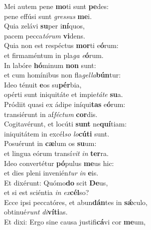 \evenverse Mei autem pene \textbf{mo}ti sunt \textbf{pe}des:~\*\\
\evenverse pene effúsi sunt \textit{gres}\textit{sus} \textbf{me}i.\\
\oddverse Quia zelávi \textbf{su}per i\textbf{ní}quos,~\*\\
\oddverse pacem pecca\textit{tó}\textit{rum} \textbf{vi}dens.\\
\evenverse Quia non est respéctus \textbf{mor}ti e\textbf{ó}rum:~\*\\
\evenverse et firmaméntum in pla\textit{ga} \textit{e}\textbf{ó}rum.\\
\oddverse In labóre \textbf{hó}minum \textbf{non} sunt:~\*\\
\oddverse et cum homínibus non fla\textit{gel}\textit{la}\textbf{bún}tur:\\
\evenverse Ideo ténuit \textbf{e}os su\textbf{pér}bia,~\*\\
\evenverse opérti sunt iniquitáte et impie\textit{tá}\textit{te} \textbf{su}a.\\
\oddverse Pródiit quasi ex ádipe iníqui\textbf{tas} e\textbf{ó}rum:~\*\\
\oddverse transiérunt in af\textit{fé}\textit{ctum} \textbf{cor}dis.\\
\evenverse Cogitavérunt, et locúti \textbf{sunt} ne\textbf{quí}tiam:~\*\\
\evenverse iniquitátem in excél\textit{so} \textit{lo}\textbf{cú}\textbf{ti} sunt.\\
\oddverse Posuérunt in \textbf{cæ}lum os \textbf{su}um:~\*\\
\oddverse et lingua eórum transí\textit{vit} \textit{in} \textbf{ter}ra.\\
\evenverse Ideo convertétur \textbf{pó}pulus \textbf{me}us hic:~\*\\
\evenverse et dies pleni invenién\textit{tur} \textit{in} \textbf{e}is.\\
\oddverse Et dixérunt: Quómo\textbf{do} scit \textbf{De}us,~\*\\
\oddverse et si est sciéntia \textit{in} \textit{ex}\textbf{cél}so?\\
\evenverse Ecce ipsi peccatóres, et abun\textbf{dán}tes in \textbf{sǽ}culo,~\*\\
\evenverse obtinué\textit{runt} \textit{di}\textbf{ví}\textbf{ti}as.\\
\oddverse Et dixi: Ergo sine causa justifi\textbf{cá}vi cor \textbf{me}um,~\*\\
